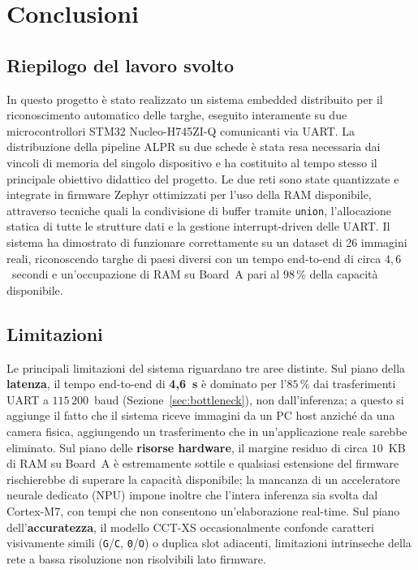 \chapter{Conclusioni}
\label{cap:conclusioni}

\section{Riepilogo del lavoro svolto}
\label{sec:riepilogo}

In questo progetto è stato realizzato un sistema embedded distribuito per il riconoscimento automatico delle targhe, eseguito interamente su due microcontrollori STM32 Nucleo-H745ZI-Q comunicanti via UART. La distribuzione della pipeline ALPR su due schede è stata resa necessaria dai vincoli di memoria del singolo dispositivo e ha costituito al tempo stesso il principale obiettivo didattico del progetto. Le due reti sono state quantizzate e integrate in firmware Zephyr ottimizzati per l'uso della RAM disponibile, attraverso tecniche quali la condivisione di buffer tramite \texttt{union}, l'allocazione statica di tutte le strutture dati e la gestione interrupt-driven delle UART. Il sistema ha dimostrato di funzionare correttamente su un dataset di 26 immagini reali, riconoscendo targhe di paesi diversi con un tempo end-to-end di circa $4{,}6$~secondi e un'occupazione di RAM su Board~A pari al $98\,\%$ della capacità disponibile.

\section{Limitazioni}
\label{sec:limitazioni}

Le principali limitazioni del sistema riguardano tre aree distinte. Sul piano della \textbf{latenza}, il tempo end-to-end di \textbf{4,6~s} è dominato per l'$85\,\%$ dai trasferimenti UART a $115\,200$~baud (Sezione~\ref{sec:bottleneck}), non dall'inferenza; a questo si aggiunge il fatto che il sistema riceve immagini da un PC host anziché da una camera fisica, aggiungendo un trasferimento che in un'applicazione reale sarebbe eliminato. Sul piano delle \textbf{risorse hardware}, il margine residuo di circa $10$~KB di RAM su Board~A è estremamente sottile e qualsiasi estensione del firmware rischierebbe di superare la capacità disponibile; la mancanza di un acceleratore neurale dedicato (NPU) impone inoltre che l'intera inferenza sia svolta dal Cortex-M7, con tempi che non consentono un'elaborazione real-time. Sul piano dell'\textbf{accuratezza}, il modello CCT-XS occasionalmente confonde caratteri visivamente simili (\texttt{G}/\texttt{C}, \texttt{0}/\texttt{O}) o duplica slot adiacenti, limitazioni intrinseche della rete a bassa risoluzione non risolvibili lato firmware.

